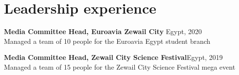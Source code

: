\documentclass[10pt]{article}
\begin{document}
\section{Leadership experience}
\textbf{Media Committee Head, Euroavia Zewail City} \hfill Egypt, 2020\\
Managed a team of 10 people for the Euroavia Egypt student branch

\textbf{Media Committee Head, Zewail City Science Festival}\hfill Egypt, 2019\\
Managed a team of 15 people for the Zewail City Science Festival mega event
\end{document}
